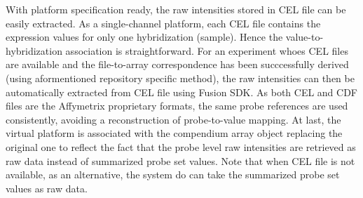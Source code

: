 With platform specification ready, the raw intensities stored in CEL file can
be easily extracted.
%
As a single-channel platform, each CEL file contains the expression values for
only one hybridization (sample).  Hence the value-to-hybridization association
is straightforward.
%
For an experiment whoes CEL files are available and the file-to-array
correspondence has been succcessfully derived (using aformentioned repository
specific method), the raw intensities can then be automatically extracted from
CEL file using Fusion SDK.
%
As both CEL and CDF files are the Affymetrix proprietary formats, the same
probe references are used consistently, avoiding a reconstruction of
probe-to-value mapping.
%
At last, the virtual platform is associated with the compendium array object
replacing the original one to reflect the fact that the probe level raw
intensities are retrieved as raw data instead of summarized probe set values.
%
Note that when CEL file is not available, as an alternative, the system do can
take the summarized probe set values as raw data.












